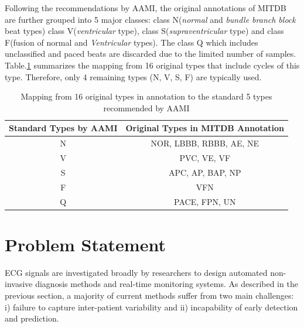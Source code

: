 Following the recommendations by AAMI, the original annotations of MITDB are further grouped into 5 major classes: class N(\textit{normal} and \textit{bundle branch block} beat types) class V(\textit{ventricular} type), class S(\textit{supraventricular} type) and class F(fusion of normal and \textit{Ventricular} types). The class Q which includes unclassified and paced beats are discarded due to the limited number of samples. Table.\ref{table:grouping_types} summarizes the mapping from 16 original types that include cycles of this type. Therefore, only 4 remaining types (N, V, S, F) are typically used.%

\begin{table}[h]
\centering
\caption{Mapping from 16 original types in annotation to the standard 5 types recommended by AAMI}
\label{table:grouping_types}
\begin{tabular}{|c|c|}
\hline
Standard Types by AAMI & Original Types in MITDB Annotation \\ \hline
N                      & NOR, LBBB, RBBB, AE, NE            \\ \hline
V                      & PVC, VE, VF                        \\ \hline
S                      & APC, AP, BAP, NP                   \\ \hline
F                      & VFN                                \\ \hline
Q                      & PACE, FPN, UN                      \\ \hline
\end{tabular}
\end{table}




\section{Problem Statement}

ECG signals are investigated broadly by researchers to design automated non-invasive diagnosis methods and real-time monitoring systems\cite{Kiranyaz, chen2018predictive, jchen}. As described in the previous section, a majority of current methods suffer from two main challenges: i) failure to capture inter-patient variability and ii) incapability of early detection and prediction. %

